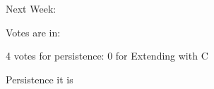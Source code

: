 \documentclass{beamer}
\begin{document}
\begin{frame}[fragile]{Next Week:}

\vfill
{\Large Votes are in:}

\vfill
{\Large 4 votes for persistence: 0 for Extending with C}

\vfill
{\LARGE Persistence it is}

\vfill

\end{frame}


%
%
%
\end{document}
